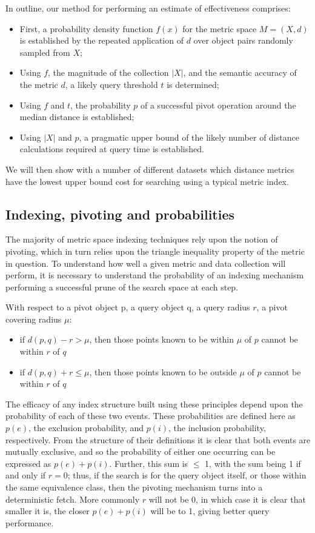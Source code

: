 In outline, our method for performing an estimate of effectiveness comprises:
\begin{itemize}
\item First, a probability density function $f(x)$ for the metric space $M = (X, d)$  is established by the repeated application of $d$ over object pairs randomly sampled from $X$;
\item Using $f$, the magnitude of the collection $|X|$, and the semantic accuracy of the metric $d$, a likely query threshold $t$ is determined;
\item Using $f$ and $t$, the probability $p$ of a successful pivot operation around the median distance is established;
\item Using $|X|$ and $p$, a pragmatic upper bound of the likely number of distance calculations required at query time is established.
\end{itemize}
We will then show with a number of different datasets which distance metrics have the lowest upper bound cost for searching using a typical metric index.
\subsection{Indexing, pivoting and probabilities}
The majority of metric space indexing techniques rely upon the notion of pivoting, which in turn relies upon the triangle inequality property of the metric in question. To understand how well a given metric and data collection will perform, it is necessary to understand the probability of an indexing mechanism performing a successful prune of the search space at each step.

With respect to a pivot object p, a query object q, a query radius $r$, a pivot covering radius $\mu$:
\begin{itemize}
\item if $d(p,q) - r > \mu$, then those points known to be within $\mu$ of $p$ cannot be within $r$ of $q$
\item if $d(p,q) + r \leq \mu$, then those points known to be outside $\mu$ of $p$ cannot be within $r$ of $q$
\end{itemize}

The efficacy of any index structure built using these principles depend upon the probability of each of these two events. These probabilities are defined here as $p(e)$, the exclusion probability, and $p(i)$, the inclusion probability, respectively. From the structure of their definitions it is clear that both events are mutually exclusive, and so the probability of either one occurring can be expressed as $p(e) + p(i)$. Further, this sum is $\leq$ 1, with the sum being 1 if and only if $r = 0$; thus, if the search is for the query object itself, or those within the same equivalence class, then the pivoting mechanism turns into a deterministic fetch. More commonly $r$ will not be $0$, in which case it is clear that smaller it is, the closer $p(e) + p(i)$ will be to 1, giving better query performance.

